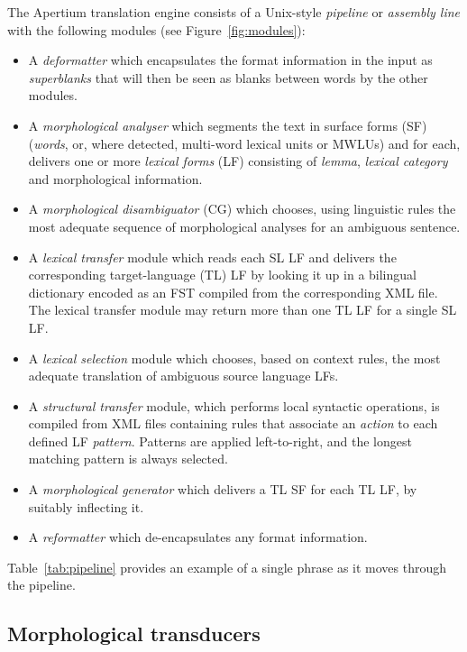 \documentclass[a4paper,11pt]{article}
\newenvironment{itemise}[1]{
        \begin{itemize}[itemsep=-0.3em,leftmargin=1em,itemindent=0em]
        \vspace{-0.6em}
        #1
}{
        \end{itemize}
        \vspace{-2pt}
}
\begin{document}
The Apertium translation engine consists of a Unix-style \emph{pipeline} or
\emph{assembly line} with the following modules (see Figure~\ref{fig:modules}):  
\begin{itemise}
\item A \emph{deformatter} which encapsulates the format information
 in the input as \emph{superblanks} that will then be seen
 as blanks between words by the other modules.
\item A \emph{morphological analyser} which segments the text in
  surface forms (SF) (\emph{words}, or, where detected, multi-word lexical
  units or MWLUs) and for each, delivers one or more \emph{lexical
    forms} (LF) consisting of \emph{lemma}, \emph{lexical category} and
  morphological information. 
\item A \emph{morphological disambiguator} (CG) which chooses, using linguistic rules
  the most adequate sequence of morphological analyses for an ambiguous sentence. 
\item A \emph{lexical transfer} module which reads each SL LF 
  and delivers the corresponding target-language (TL) LF
  by looking it up in a bilingual dictionary encoded as an FST
  compiled from the corresponding XML file. The lexical transfer module may
  return more than one TL LF for a single SL LF.
\item A \emph{lexical selection} module \citep{tyers12a} which chooses, based on context 
  rules, the most adequate translation of ambiguous source language LFs.
\item A \emph{structural transfer} module, which
    performs local syntactic operations, is compiled from XML files containing rules that 
    associate an \emph{action} to each defined LF \emph{pattern}. Patterns are applied left-to-right, and the 
    longest matching pattern is always selected.
\item A \emph{morphological generator} which delivers a TL SF
 for each TL LF, by suitably inflecting it. 
\item A \emph{reformatter} which de-encapsulates any format
  information.
\end{itemise}

Table~\ref{tab:pipeline} provides an example of a single phrase as it moves through the pipeline.

\subsection{Morphological transducers}
\end{document}
